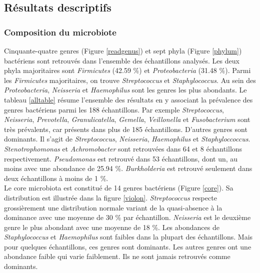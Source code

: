 \documentclass[12pt,a4paper]{article}
\begin{document}
\subsection{Résultats descriptifs}
\subsubsection{Composition du microbiote}
Cinquante-quatre genres (Figure \ref{readgenus}) et sept phyla (Figure \ref{phylum}) bactériens sont retrouvés dans l'ensemble des échantillons analysés.
Les deux phyla majoritaires sont \textit{Firmicutes} (42.59 \%) et \textit{Proteobacteria} (31.48 \%). Parmi les \textit{Firmicutes} majoritaires, on trouve \textit{Streptococcus} et \textit{Staphylococcus}. Au sein des \textit{Proteobacteria}, \textit{Neisseria} et \textit{Haemophilus} sont les genres les plus abondants.
Le tableau \ref{alltable} résume l'ensemble des résultats en y associant la prévalence des genres bactériens parmi les 188 échantillons.
Par exemple \textit{Streptococcus}, \textit{Neisseria}, \textit{Prevotella}, \textit{Granulicatella}, \textit{Gemella}, \textit{Veillonella} et \textit{Fusobacterium} sont très prévalents, car présents dans plus de 185 échantillons.
D’autres genres sont dominants. Il s’agit de \textit{Streptococcus}, \textit{Neisseria}, \textit{Haemophilus} et \textit{Staphyloccoccus}. \textit{Stenotrophomonas} et \textit{Achromobacter} sont retrouvées dans 64 et 8 échantillons respectivement. \textit{Pseudomonas} est retrouvé dans 53 échantillons, dont un, au moins avec une abondance de 25.94 \%. \textit{Burkholderia} est retrouvé seulement dans deux échantillons à moins de 1 \%.\\
Le core microbiota est constitué de 14 genres bactériens (Figure \ref{core}). Sa distribution est illustrée dans la figure \ref{violon}.
\textit{Streptococcus} respecte grossièrement une distribution normale variant de la quasi-absence à la dominance avec une moyenne de 30 \% par échantillon. \textit{Neisseria} est le deuxième genre le plus abondant avec une moyenne de 18 \%.
Les abondances de \textit{Staphylococcus} et \textit{Haemophilus} sont faibles dans la plupart des échantillons. Mais pour quelques échantillons, ces genres sont dominants. Les autres genres ont une abondance faible qui varie faiblement. Ils ne sont jamais retrouvés comme dominants.
\end{document}
